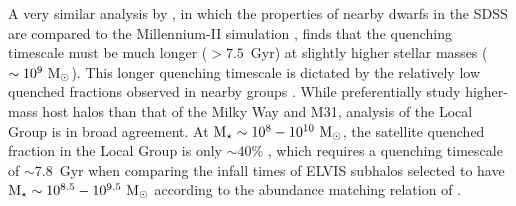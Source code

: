 \documentclass[usenatbib]{mn2e}
\newcommand{\mstar}{{\rm M}_{\star}}
\newcommand{\msun}{{\rm M}_{\odot}}
\begin{document}
A very similar analysis by \citet{wheeler14}, in which the properties
of nearby dwarfs in the SDSS are compared to the Millennium-II
simulation \citep{bk09}, finds that the quenching timescale must be
much longer ($>7.5$~Gyr) at slightly higher stellar masses
($\sim10^{9}~\msun$). This longer quenching timescale is dictated by
the relatively low quenched fractions observed in nearby groups
\citep{geha12}. While \citet{wheeler14} preferentially study
higher-mass host halos than that of the Milky Way and M31, analysis of
the Local Group is in broad agreement. At $\mstar \sim
10^{8}-10^{10}~\msun$, the satellite quenched fraction in the Local
Group is only $\sim40\%$ \citep{wheeler14, phillips15, slater14},
which requires a quenching timescale of $\sim7.8$~Gyr when comparing
the infall times of ELVIS subhalos selected to have $\mstar \sim
10^{8.5}-10^{9.5}~\msun$ according to the abundance matching relation
of \cite{gk14}.
\end{document}
